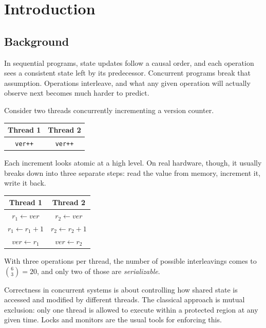 \chapter{Introduction}

\section{Background}
\label{sec:intro}

In sequential programs, state updates follow a causal order, and
each operation sees a consistent state left by its predecessor.
Concurrent programs break that assumption. Operations interleave, and what
any given operation will actually observe next becomes much harder to
predict.

Consider two threads concurrently incrementing a version counter.

\begin{table}[ht]
  \centering
  \begin{tabular}{cc}
    \toprule
    \textbf{Thread 1} & \textbf{Thread 2} \\
    \midrule
    \texttt{ver++}    & \texttt{ver++}    \\
    \bottomrule
  \end{tabular}
\end{table}

\noindent Each increment looks atomic at a high level. On real hardware,
though, it usually breaks down into three separate steps: read the value
from memory, increment it, write it back.

\begin{table}[ht]
  \centering
  \begin{tabular}{cc}
    \toprule
    \textbf{Thread 1}        & \textbf{Thread 2}        \\
    \midrule
    $r_1 \gets \mathit{ver}$ & $r_2 \gets \mathit{ver}$ \\
    $r_1 \gets r_1 + 1$      & $r_2 \gets r_2 + 1$      \\
    $\mathit{ver} \gets r_1$ & $\mathit{ver} \gets r_2$ \\
    \bottomrule
  \end{tabular}
\end{table}

\noindent With three operations per thread, the number of possible
interleavings comes to $\displaystyle \binom{6}{3} = 20$, and only two of
those are \emph{serializable}.

Correctness in concurrent systems is about controlling how shared state
is accessed and modified by different threads. The classical approach is
mutual exclusion: only one thread is allowed to execute within a
protected region at any given time. Locks and monitors are the usual
tools for enforcing this.

